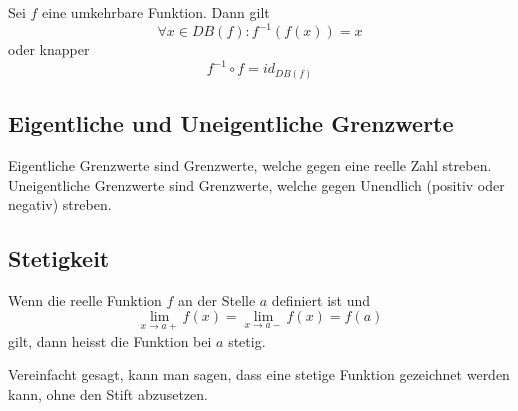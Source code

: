 Sei $f$ eine umkehrbare Funktion. Dann gilt
%
\begin{displaymath}
	\forall x \in DB(f): f^{-1}(f(x)) = x
\end{displaymath}
%
oder knapper
%
\begin{displaymath}
	f^{-1} \circ f = id_{DB(f)}
\end{displaymath}

\subsection{Eigentliche und Uneigentliche Grenzwerte}

Eigentliche Grenzwerte sind Grenzwerte, welche gegen eine reelle Zahl streben. Uneigentliche
Grenzwerte sind Grenzwerte, welche gegen Unendlich (positiv oder negativ) streben.

\subsection{Stetigkeit}

Wenn die reelle Funktion $f$ an der Stelle $a$ definiert ist und
%
\begin{displaymath}
	\lim_{x \to a+} f(x) = \lim_{x \to a-} f(x) = f(a)
\end{displaymath}
%
gilt, dann heisst die Funktion bei $a$ stetig.

Vereinfacht gesagt, kann man sagen, dass eine stetige Funktion gezeichnet werden kann, ohne den
Stift abzusetzen.
